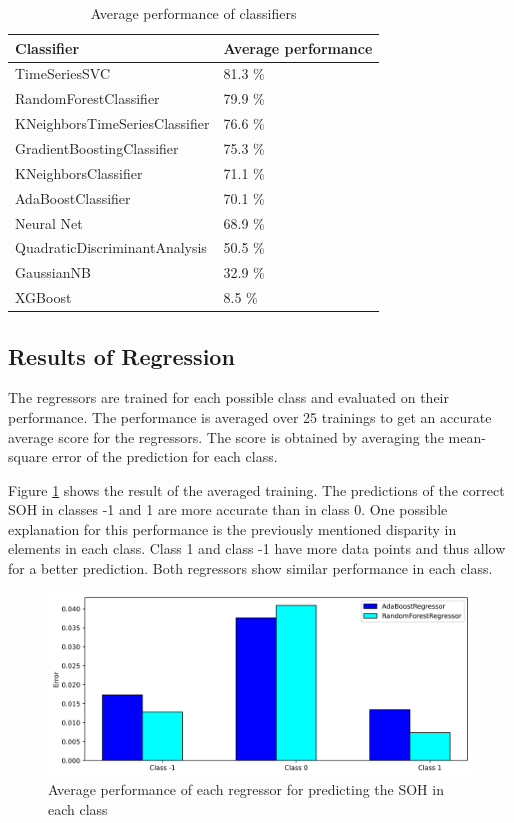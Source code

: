 \begin{table}
	\begin{center}
		\begin{tabular}{|| l | l ||}
			\hline
			\rule{0pt}{2ex}Classifier & Average performance\\
			\hline
			\hline
			\rule{0pt}{2ex}TimeSeriesSVC & 81.3 \%\\	\hline
			RandomForestClassifier & 79.9 \% \\ \hline
			KNeighborsTimeSeriesClassifier & 76.6 \%\\ \hline
			GradientBoostingClassifier & 75.3 \%\\ \hline
			KNeighborsClassifier & 71.1 \%\\ \hline
			AdaBoostClassifier & 70.1 \% \\ \hline
			Neural Net & 68.9 \% \\ \hline
			QuadraticDiscriminantAnalysis & 50.5 \% \\ \hline
			GaussianNB & 32.9 \% \\ \hline
			XGBoost & 8.5 \% \\ \hline
			\hline
		\end{tabular}
		\caption{Average performance of classifiers}
		\label{score}
	\end{center}
	\vspace{-4mm}
\end{table}
\newpage
\subsection{Results of Regression}

The regressors are trained for each possible class and evaluated on their performance. The performance is averaged over 25 trainings to get an accurate average score for the regressors. The score is obtained by averaging the mean-square error of the prediction for each class.

Figure \ref{fig:avgperf_reg} shows the result of the averaged training. The predictions of the correct SOH in classes -1 and 1 are more accurate than in class 0. One possible explanation for this performance is the previously mentioned disparity in elements in each class. Class 1 and class -1 have more data points and thus allow for a better prediction. Both regressors show similar performance in each class.

\begin{figure}[H]
	\centering
	\includegraphics[width=1\linewidth]{IMGs/Average_performance_REG.png}
	\caption{Average performance of each regressor for predicting the SOH in each class}
	\label{fig:avgperf_reg}
\end{figure}
